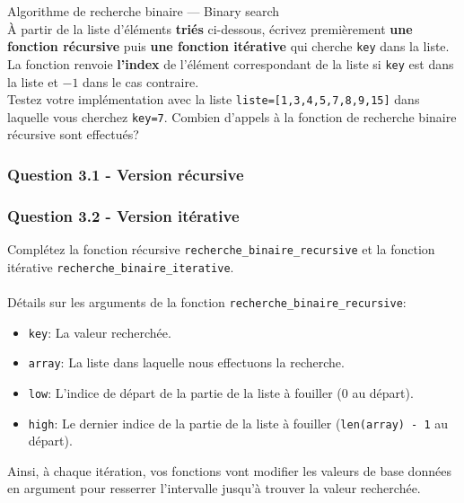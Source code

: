     \begin{Exercice}[20 minutes] [Python] Algorithme de recherche binaire — Binary search\\
    
    À partir de la liste d'éléments \textbf{triés} ci-dessous, écrivez premièrement \textbf{une fonction récursive} puis \textbf{une fonction itérative} qui cherche \texttt{key} dans la liste. La fonction renvoie \textbf{l'index} de l'élément correspondant de la liste si \texttt{key} est dans la liste et $-1$ dans le cas contraire.\\

    Testez votre implémentation avec la liste \texttt{liste=[1,3,4,5,7,8,9,15]} dans laquelle vous cherchez \texttt{key=7}. Combien d'appels à la fonction de recherche binaire récursive sont effectués?
    
    \subsubsection*{Question 3.1 - Version récursive}
    
    
    \subsubsection*{Question 3.2 - Version itérative}
    
    
    
        \begin{conseil}
            Complétez la fonction récursive \lstinline{recherche_binaire_recursive} et la fonction itérative \lstinline{recherche_binaire_iterative}.\\\\
            Détails sur les arguments de la fonction \lstinline{recherche_binaire_recursive}:
            \begin{itemize}
            \item \lstinline{key}: La valeur recherchée.
            \item \lstinline{array}: La liste dans laquelle nous effectuons la recherche.
            \item \lstinline{low}: L'indice de départ de la partie de la liste à fouiller (0 au départ).
            \item \lstinline{high}: Le dernier indice de la partie de la liste à fouiller (\lstinline{len(array) - 1} au départ).
            \end{itemize}
            Ainsi, à chaque itération, vos fonctions vont modifier les valeurs de base données en argument pour resserrer l'intervalle jusqu'à trouver la valeur recherchée.\\        
            

\end{conseil}
\end{Exercice}
